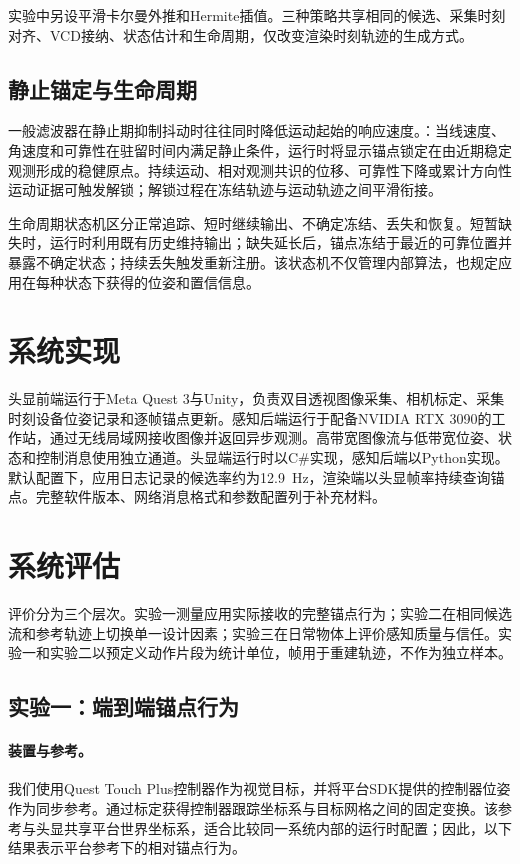 \documentclass[review]{vgtc}
\newcommand{\system}{EgoAnchor}
\begin{document}
实验中另设平滑卡尔曼外推和Hermite插值。三种策略共享相同的候选、采集时刻对齐、VCD接纳、状态估计和生命周期，仅改变渲染时刻轨迹的生成方式。

\subsection{静止锚定与生命周期}
一般滤波器在静止期抑制抖动时往往同时降低运动起始的响应速度。：当线速度、角速度和可靠性在驻留时间内满足静止条件，运行时将显示锚点锁定在由近期稳定观测形成的稳健原点。持续运动、相对观测共识的位移、可靠性下降或累计方向性运动证据可触发解锁；解锁过程在冻结轨迹与运动轨迹之间平滑衔接。

生命周期状态机区分正常追踪、短时继续输出、不确定冻结、丢失和恢复。短暂缺失时，运行时利用既有历史维持输出；缺失延长后，锚点冻结于最近的可靠位置并暴露不确定状态；持续丢失触发重新注册。该状态机不仅管理内部算法，也规定应用在每种状态下获得的位姿和置信信息。

\section{系统实现}
头显前端运行于Meta Quest 3与Unity，负责双目透视图像采集、相机标定、采集时刻设备位姿记录和逐帧锚点更新。感知后端运行于配备NVIDIA RTX 3090的工作站，通过无线局域网接收图像并返回异步观测。高带宽图像流与低带宽位姿、状态和控制消息使用独立通道。头显端运行时以C\#实现，感知后端以Python实现。默认配置下，应用日志记录的候选率约为12.9~Hz，渲染端以头显帧率持续查询锚点。完整软件版本、网络消息格式和参数配置列于补充材料。

\section{系统评估}
评价分为三个层次。实验一测量应用实际接收的完整锚点行为；实验二在相同候选流和参考轨迹上切换单一设计因素；实验三在日常物体上评价感知质量与信任。实验一和实验二以预定义动作片段为统计单位，帧用于重建轨迹，不作为独立样本。

\subsection{实验一：端到端锚点行为}

\paragraph{装置与参考。}
我们使用Quest Touch Plus控制器作为视觉目标，并将平台SDK提供的控制器位姿作为同步参考。通过标定获得控制器跟踪坐标系与目标网格之间的固定变换。该参考与头显共享平台世界坐标系，适合比较同一系统内部的运行时配置；因此，以下结果表示平台参考下的相对锚点行为。
\end{document}
